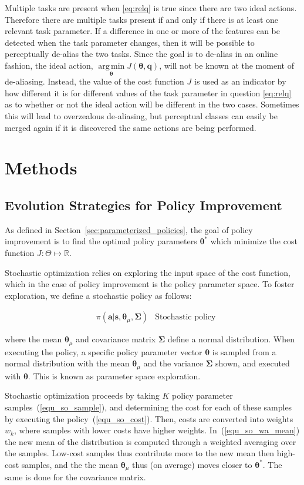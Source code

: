 \documentclass[12pt]{article}
\newcommand{\mymath}[1]{\ensuremath{#1}\xspace}
\newcommand{\act}    {\mymath{\mathbf{a}}}
\newcommand{\sta}    {\mymath{\mathbf{s}}}
\newcommand{\app}    {\mymath{\bm{\theta}}}
\newcommand{\appsp}  {\mymath{\Theta}}
\newcommand{\taskp}  {\mymath{\mathbf{q}}}
\newcommand{\costf}  {\mymath{J}}
\newcommand{\covar}  {\mymath{\bm{\Sigma}}}
\DeclareMathOperator*{\argmin}{arg\,min}
\newcommand{\argminvar}[1]{\ensuremath{\underset{#1}{{\argmin}}}}
\begin{document}
Multiple tasks are present when \eqref{eq:relq} is true since there are two ideal actions. Therefore there are multiple tasks present if and only if there is at least one relevant task parameter. If a difference in one or more of the features can be detected when the task parameter changes, then it will be possible to perceptually de-alias the two tasks. Since the goal is to de-alias in an online fashion, the ideal action, $\argminvar{\app}\costf(\app,\taskp)$, will not be known at the moment of de-aliasing. Instead, the value of the cost function $\costf$ is used as an indicator by how different it is for different values of the task parameter in question \eqref{eq:relq} as to whether or not the ideal action will be different in the two cases. Sometimes this will lead to overzealous de-aliasing, but perceptual classes can easily be merged again if it is discovered the same actions are being performed.

\section{Methods}

\subsection{Evolution Strategies for Policy Improvement}
\label{sec:evolution_strategies}

As defined in Section~\ref{sec:parameterized_policies}, the goal of policy improvement is to find the optimal policy parameters $\app^*$ which minimize the cost function $J:\appsp \mapsto \mathbb{R}$.

Stochastic optimization relies on exploring the input space of the cost function, which in the case of policy improvement is the policy parameter space. To foster exploration, we define a stochastic policy as follows:

\begin{align}
& \pi(\act|\sta,\app_\mu,\covar) & \mbox{Stochastic policy} \label{eq:stoch}
\end{align}

where the mean $\app_\mu$ and covariance matrix \covar  define a normal distribution. When executing the policy, a specific policy parameter vector \app is sampled from a normal distribution with the mean $\app_\mu$ and the variance $\covar$ shown, and executed with \app. This is known as parameter space exploration. 

Stochastic optimization proceeds by taking $K$ policy parameter samples~(\ref{equ_so_sample}), and determining the cost for each of these samples by executing the policy~(\ref{equ_so_cost}). Then, costs are converted into weights $w_k$, where samples with lower costs have higher weights. In~(\ref{equ_so_wa_mean}) the new mean of the distribution is computed through a weighted averaging over the samples. Low-cost samples thus contribute more to the new mean then high-cost samples, and the the mean $\app_\mu$ thus (on average) moves closer to $\app^*$. The same is done for the covariance matrix.
\end{document}
